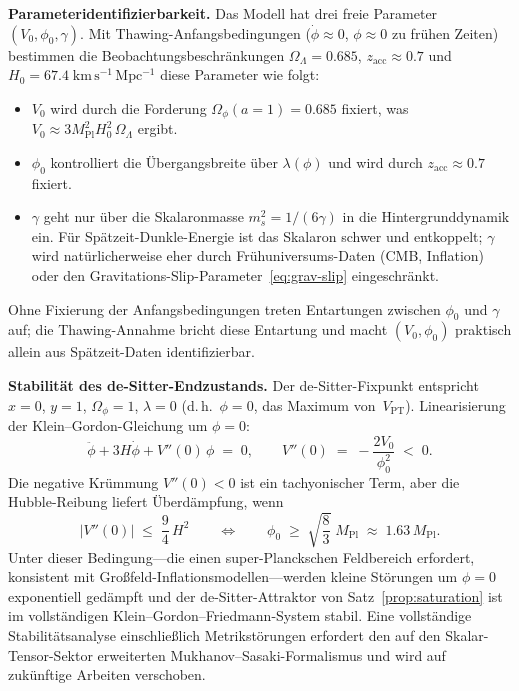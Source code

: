 \documentclass[12pt,a4paper]{article}
\theoremstyle{definition}
\theoremstyle{plain}
\theoremstyle{remark}
\begin{document}
\medskip
\noindent\textbf{Parameteridentifizierbarkeit.}\;
Das Modell hat drei freie Parameter $(V_0, \phi_0, \gamma)$.
Mit Thawing-Anfangsbedingungen ($\dot\phi \approx 0$, $\phi \approx 0$
zu fr\"uhen Zeiten) bestimmen die Beobachtungsbeschr\"ankungen
$\Omega_\Lambda = 0.685$, $z_{\mathrm{acc}} \approx 0.7$ und
$H_0 = 67.4\;\mathrm{km\,s^{-1}\,Mpc^{-1}}$ diese Parameter wie folgt:
\begin{itemize}
  \item $V_0$ wird durch die Forderung
        $\Omega_\phi(a=1) = 0.685$ fixiert, was
        $V_0 \approx 3M_{\mathrm{Pl}}^2 H_0^2\,\Omega_\Lambda$ ergibt.
  \item $\phi_0$ kontrolliert die \"Ubergangsbreite \"uber $\lambda(\phi)$
        und wird durch $z_{\mathrm{acc}} \approx 0.7$ fixiert.
  \item $\gamma$ geht nur \"uber die Skalaronmasse
        $m_s^2 = 1/(6\gamma)$ in die Hintergrunddynamik ein. F\"ur
        Sp\"atzeit-Dunkle-Energie ist das Skalaron schwer und entkoppelt;
        $\gamma$ wird nat\"urlicherweise eher durch Fr\"uhuniversums-Daten
        (CMB, Inflation) oder den
        Gravitations-Slip-Parameter~\eqref{eq:grav-slip} eingeschr\"ankt.
\end{itemize}
Ohne Fixierung der Anfangsbedingungen treten Entartungen zwischen
$\phi_0$ und $\gamma$ auf; die Thawing-Annahme bricht diese Entartung
und macht $(V_0, \phi_0)$ praktisch allein aus Sp\"atzeit-Daten
identifizierbar.

\medskip
\noindent\textbf{Stabilit\"at des de-Sitter-Endzustands.}\;
Der de-Sitter-Fixpunkt entspricht $x = 0$, $y = 1$,
$\Omega_\phi = 1$, $\lambda = 0$ (d.\,h.\ $\phi = 0$, das Maximum
von~$V_{\mathrm{PT}}$). Linearisierung der Klein--Gordon-Gleichung um
$\phi = 0$:
\begin{equation}
  \ddot\phi + 3H\dot\phi + V''(0)\,\phi \;=\; 0,
  \qquad
  V''(0) \;=\; -\frac{2V_0}{\phi_0^2} \;<\; 0.
\end{equation}
Die negative Kr\"ummung $V''(0) < 0$ ist ein tachyonischer Term, aber
die Hubble-Reibung liefert \"Uberd\"ampfung, wenn
\begin{equation}\label{eq:stability-condition}
  |V''(0)| \;\le\; \frac{9}{4}\,H^2
  \qquad\Longleftrightarrow\qquad
  \phi_0 \;\ge\; \sqrt{\frac{8}{3}}\;M_{\mathrm{Pl}}
  \;\approx\; 1.63\,M_{\mathrm{Pl}}.
\end{equation}
Unter dieser Bedingung---die einen super-Planckschen Feldbereich
erfordert, konsistent mit Gro\ss feld-Inflationsmodellen---werden kleine
St\"orungen um $\phi = 0$ exponentiell ged\"ampft und der
de-Sitter-Attraktor von Satz~\ref{prop:saturation} ist im
vollst\"andigen Klein--Gordon--Friedmann-System stabil. Eine
vollst\"andige Stabilit\"atsanalyse einschlie\ss lich
Metrikst\"orungen erfordert den auf den Skalar-Tensor-Sektor
erweiterten Mukhanov--Sasaki-Formalismus und wird auf zuk\"unftige
Arbeiten verschoben.
\end{document}
